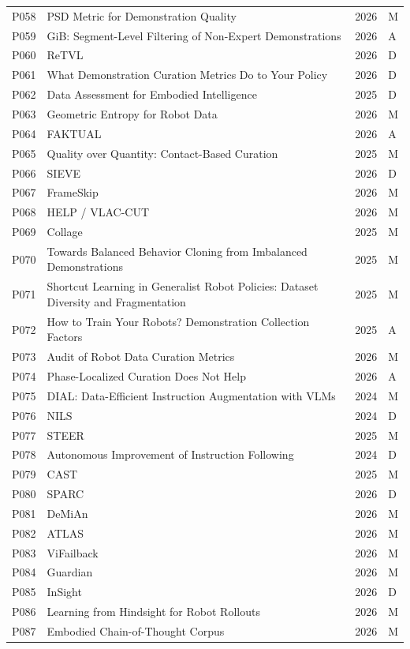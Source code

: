 \begin{longtable}{@{}p{1.3cm}p{11.8cm}p{2.2cm}p{1.2cm}@{}}
P058 & PSD Metric for Demonstration Quality & 2026 & M \\
P059 & GiB: Segment-Level Filtering of Non-Expert Demonstrations & 2026 & A \\
P060 & ReTVL & 2026 & D \\
P061 & What Demonstration Curation Metrics Do to Your Policy & 2026 & D \\
P062 & Data Assessment for Embodied Intelligence & 2025 & D \\
P063 & Geometric Entropy for Robot Data & 2026 & M \\
P064 & FAKTUAL & 2026 & A \\
P065 & Quality over Quantity: Contact-Based Curation & 2025 & M \\
P066 & SIEVE & 2026 & D \\
P067 & FrameSkip & 2026 & M \\
P068 & HELP / VLAC-CUT & 2026 & M \\
P069 & Collage & 2025 & M \\
P070 & Towards Balanced Behavior Cloning from Imbalanced Demonstrations & 2025 & M \\
P071 & Shortcut Learning in Generalist Robot Policies: Dataset Diversity and Fragmentation & 2025 & M \\
P072 & How to Train Your Robots? Demonstration Collection Factors & 2025 & A \\
P073 & Audit of Robot Data Curation Metrics & 2026 & M \\
P074 & Phase-Localized Curation Does Not Help & 2026 & A \\
P075 & DIAL: Data-Efficient Instruction Augmentation with VLMs & 2024 & M \\
P076 & NILS & 2024 & D \\
P077 & STEER & 2025 & M \\
P078 & Autonomous Improvement of Instruction Following & 2024 & D \\
P079 & CAST & 2025 & M \\
P080 & SPARC & 2026 & D \\
P081 & DeMiAn & 2026 & M \\
P082 & ATLAS & 2026 & M \\
P083 & ViFailback & 2026 & M \\
P084 & Guardian & 2026 & M \\
P085 & InSight & 2026 & D \\
P086 & Learning from Hindsight for Robot Rollouts & 2026 & M \\
P087 & Embodied Chain-of-Thought Corpus & 2026 & M \\

\end{longtable}
